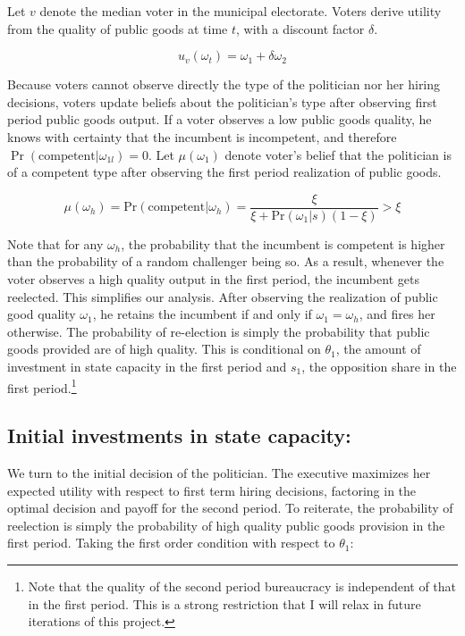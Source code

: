 \documentclass[12pt,]{article}
\let\rmarkdownfootnote\footnote%
\def\footnote{\protect\rmarkdownfootnote}
\begin{document}
Let \(v\) denote the median voter in the municipal electorate. Voters
derive utility from the quality of public goods at time \(t\), with a
discount factor \(\delta\).

\[u_v(\omega_t) = \omega_1 + \delta \omega_2\]

Because voters cannot observe directly the type of the politician nor
her hiring decisions, voters update beliefs about the politician's type
after observing first period public goods output. If a voter observes a
low public goods quality, he knows with certainty that the incumbent is
incompetent, and therefore \(\Pr(\text{competent}|\omega_{1l}) = 0\).
Let \(\mu(\omega_1)\) denote voter's belief that the politician is of a
competent type after observing the first period realization of public
goods.

\[\mu(\omega_h) = \text{Pr}(\text{competent}| \omega_h) = \frac{\xi}{\xi + \text{Pr}(\omega_1|s)(1-\xi)}>\xi\]

Note that for any \(\omega_h\), the probability that the incumbent is
competent is higher than the probability of a random challenger being
so. As a result, whenever the voter observes a high quality output in
the first period, the incumbent gets reelected. This simplifies our
analysis. After observing the realization of public good quality
\(\omega_1\), he retains the incumbent if and only if
\(\omega_1 = \omega_h\), and fires her otherwise. The probability of
re-election is simply the probability that public goods provided are of
high quality. This is conditional on \(\theta_1\), the amount of
investment in state capacity in the first period and \(s_1\), the
opposition share in the first period.\footnote{Note that the quality of
  the second period bureaucracy is independent of that in the first
  period. This is a strong restriction that I will relax in future
  iterations of this project.}

\hypertarget{initial-investments-in-state-capacity}{%
\subsection{Initial investments in state
capacity:}\label{initial-investments-in-state-capacity}}

We turn to the initial decision of the politician. The executive
maximizes her expected utility with respect to first term hiring
decisions, factoring in the optimal decision and payoff for the second
period. To reiterate, the probability of reelection is simply the
probability of high quality public goods provision in the first period.
Taking the first order condition with respect to \(\theta_1\):
\end{document}
